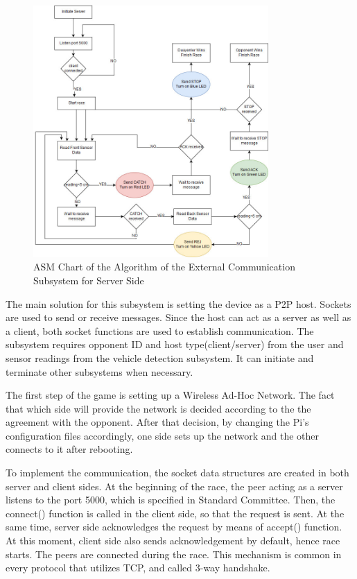 \documentclass[a4paper,12pt]{article}
\begin{document}
\begin{enumerate}
	\begin{figure}[h]
		\includegraphics[width=0.8\textwidth,center]{images/server_asm}
		\caption{ASM Chart of the Algorithm of the External Communication Subsystem for Server Side \label{fig:asmserver} }
	\end{figure}
	
	The main solution for this subsystem is setting the device as a P2P host. Sockets are used to send or receive messages.  Since the host can act as a server as well as a client, both socket functions are used to establish communication. The subsystem requires opponent ID and host type(client/server) from the user and sensor readings from the vehicle detection subsystem. It can initiate and terminate other subsystems when necessary.
	
	The first step of the game is setting up a Wireless Ad-Hoc Network. The fact that which side will provide the network is decided according to the the agreement with the opponent. After that decision, by changing the Pi's configuration files accordingly, one side sets up the network and the other connects to it after rebooting.
	
	To implement the communication, the socket data structures are created in both server and client sides. At the beginning of the race, the peer acting as a server listens to the port 5000, which is specified in Standard Committee. Then, the connect() function is called in the client side, so that the request is sent. At the same time, server side acknowledges the request by means of accept() function. At this moment, client side also sends acknowledgement by default, hence race starts. The peers are connected during the race. This mechanism is common in every protocol that utilizes TCP, and called 3-way handshake.
	

\end{enumerate}
\end{document}
